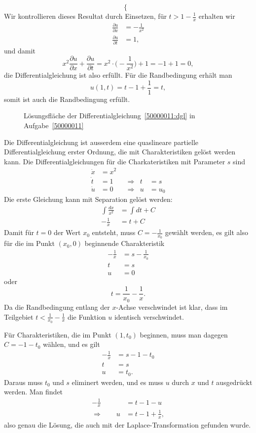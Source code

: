 \begin{loesung}
\[\begin{cases}
\end{cases}
\]
Wir kontrollieren dieses Resultat durch Einsetzen, für $t>1-\frac1x$
erhalten wir
\begin{align*}
\frac{\partial u}{\partial x}
&=-\frac1{x^2}
\\
\frac{\partial u}{\partial t}
&=1,
\end{align*}
und damit
\[
x^2\frac{\partial u}{\partial x}+\frac{\partial u}{\partial t}
=
x^2\cdot \biggl(-\frac1{x^2}\biggr) + 1 = -1 + 1=0,
\]
die Differentialgleichung ist also erfüllt.
Für die Randbedingung erhält man
\[
u(1,t)=t-1+\frac11=t,
\]
somit ist auch die Randbedingung erfüllt.
\begin{figure}
\centering
{}
\caption{Lösungsfläche der Differentialgleichung~\eqref{50000011:dgl}
in Aufgabe~\ref{50000011}
\label{50000011:graph}}
\end{figure}
\end{loesung}

\begin{diskussion}
Die Differentialgleichung ist ausserdem eine quaslineare partielle
Differentialgleichung erster Ordnung, die mit Charakteristiken gelöst
werden kann.
Die Differentialgleichungen für die Charkateristiken mit Parameter $s$
sind 
\[
\begin{aligned}
\dot x&=x^2 &&       &   &     \\
\dot t&=1   &&\Rightarrow& t &= s  \\
\dot u&=0   &&\Rightarrow& u &= u_0
\end{aligned}
\]
Die erste Gleichung kann mit Separation gelöst werden:
\begin{align*}
\int \frac{dx}{x^2}
&=
\int dt+C
\\
-\frac1x
&=
t+C
\end{align*}
Damit für $t=0$ der Wert $x_0$ entsteht, muss $C=-\frac1{x_0}$
gewählt werden, es gilt also für die im Punkt $(x_0,0)$ beginnende
Charakteristik 
\begin{align*}
-\frac1x&=s-\frac1{x_0}\\
       t&=s\\
       u&=0
\end{align*}
oder
\[
t= \frac1{x_0} - \frac1x.
\]
Da die Randbedingung entlang der $x$-Achse verschwindet ist
klar, dass im Teilgebiet $t<\frac1{x_0}-\frac1x$
die Funktion $u$ identisch verschwindet.

Für Charakteristiken, die im Punkt $(1,t_0)$ beginnen, muss man dagegen
$C=-1-t_0$ wählen, und es gilt
\begin{align*}
-\frac1x&=s-1-t_0\\
       t&=s      \\
       u&=t_0.
\end{align*}
Daraus muss $t_0$ und $s$ eliminert werden, und es muss $u$ durch $x$ und $t$
ausgedrückt werden.
Man findet
\begin{align*}
-\frac1x&=t-1-u
\\
\Rightarrow\qquad
u&=t-1+\frac1x,
\end{align*}
also genau die Lösung, die auch mit der Laplace-Transformation gefunden wurde.
\end{diskussion}

